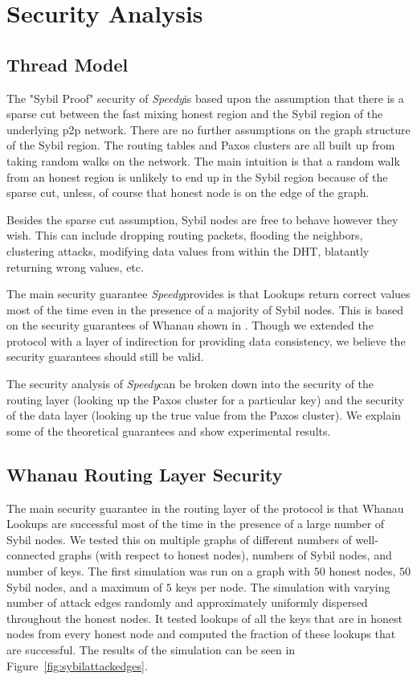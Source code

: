 \documentclass[letter]{article}
\newcommand{\sys}{\textit{Speedy}\space}
\begin{document}
\section{Security Analysis}

\subsection{Thread Model}
The "Sybil Proof" security of \sys is based upon the assumption that there is a sparse cut between the fast mixing honest region and the Sybil region of the underlying p2p network. There are no further assumptions on the graph structure of the Sybil region. The routing tables and Paxos clusters are all built up from taking random walks on the network. The main intuition is that a random walk from an honest region is unlikely to end up in the Sybil region because of the sparse cut, unless, of course that honest node is on the edge of the graph.

Besides the sparse cut assumption, Sybil nodes are free to behave however they wish. This can include dropping routing packets, flooding the neighbors, clustering attacks, modifying data values from within the DHT, blatantly returning wrong values, etc.

The main security guarantee \sys provides is that Lookups return correct values most of the time even in the presence of a majority of Sybil nodes. This is based on the security guarantees of Whanau shown in \cite{whanau}. Though we extended the protocol with a layer of indirection for providing data consistency, we believe the security guarantees should still be valid.

The security analysis of \sys can be broken down into the security of the routing layer (looking up the Paxos cluster for a particular key) and the security of the data layer (looking up the true value from the Paxos cluster). We explain some of the theoretical guarantees and show experimental results.

\subsection{Whanau Routing Layer Security}
The main security guarantee in the routing layer of the protocol is that Whanau Lookups are successful most of the time in the presence of a large number of Sybil nodes. We tested this on multiple graphs of different numbers of well-connected graphs (with respect to honest nodes), numbers of Sybil nodes, and number of keys. The first simulation was run on a graph with $50$ honest nodes, $50$ Sybil nodes, and a maximum of $5$ keys per node. The simulation with varying number of attack edges randomly and approximately uniformly dispersed throughout the honest nodes. It tested lookups of all the keys that are in honest nodes from every honest node and computed the fraction of these lookups that are successful. The results of the simulation can be seen in Figure~\ref{fig:sybilattackedges}. 
\end{document}
